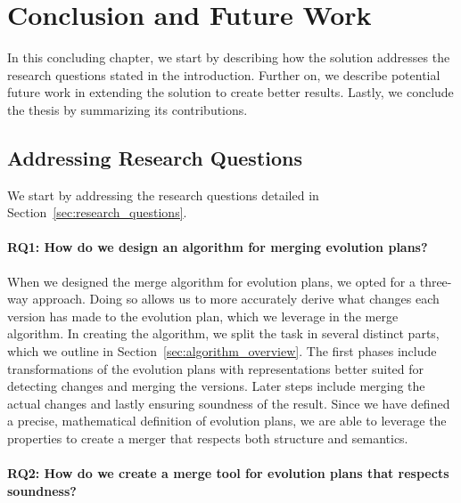 \documentclass[a4paper,english]{ifimaster}
\begin{document}
\chapter{Conclusion and Future Work}%
\label{cha:conclusion_and_future_work}

In this concluding chapter, we start by describing how the solution addresses the research questions stated in the introduction. Further on, we describe potential future work in extending the solution to create better results. Lastly, we conclude the thesis by summarizing its contributions.

\section{Addressing Research Questions}%
\label{sec:addressing_research_questions}

We start by addressing the research questions detailed in Section~\vref{sec:research_questions}.

\subsubsection{RQ1: How do we design an algorithm for merging evolution plans?} 

When we designed the merge algorithm for evolution plans, we opted for a three-way approach. Doing so allows us to more accurately derive what changes each version has made to the evolution plan, which we leverage in the merge algorithm. In creating the algorithm, we split the task in several distinct parts, which we outline in Section~\vref{sec:algorithm_overview}. The first phases include transformations of the evolution plans with representations better suited for detecting changes and merging the versions. Later steps include merging the actual changes and lastly ensuring soundness of the result. Since we have defined a precise, mathematical definition of evolution plans, we are able to leverage the properties to create a merger that respects both structure and semantics.

\subsubsection{RQ2: How do we create a merge tool for evolution plans that respects soundness?}
\end{document}
